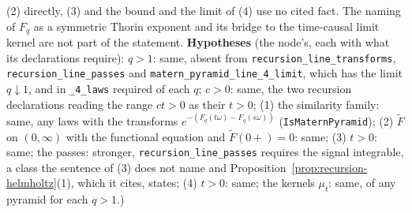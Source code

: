 \begin{theorem}
{(2) directly, (3) and the bound and the limit of (4) use no cited fact. The naming of $F_q$ as a
symmetric Thorin exponent and its bridge to the time-causal limit kernel are not part of the
statement. \textbf{Hypotheses} (the node's, each with what its declarations require): $q > 1$: same,
absent from \texttt{recursion\_line\_transforms}, \texttt{recursion\_line\_passes} and
\texttt{matern\_pyramid\_line\_4\_limit}, which has the limit $q \downarrow 1$, and in
\texttt{\_4\_laws} required of each $q$; $c > 0$: same, the two recursion declarations reading the
range $ct > 0$ as their $t > 0$; (1) the similarity family: same, any laws with the transforms
$e^{-(F_q(t\omega) - F_q(s\omega))}$ (\texttt{IsMaternPyramid}); (2) $\tilde F$ on $(0,\infty)$ with
the functional equation and $\tilde F(0{+}) = 0$: same; (3) $t > 0$: same; the passes:
stronger, \texttt{recursion\_line\_passes} requires the signal integrable, a class the sentence of (3)
does not name and Proposition~\ref{prop:recursion-helmholtz}(1), which it cites, states; (4)
$t > 0$: same; the kernels $\mu_t$: same, of any \Matern{} pyramid for each $q > 1$.)}
\end{theorem}

